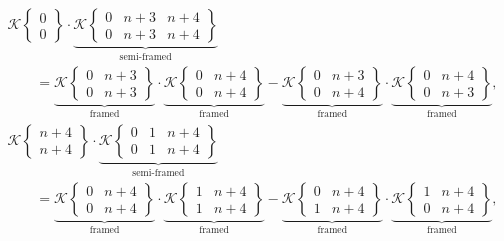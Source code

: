 \documentclass[10pt,a4paper]{amsart}
\numberwithin{equation}{section}
\begin{document}
		\begin{gather}%
\mathscr{K}\left\lbrace \begin{matrix} 0 \\ 0 \end{matrix} \right\rbrace
			\cdot \underbrace{ \mathscr{K}\left\lbrace \begin{matrix} 0 & n+3 & n+4 \\ 0 & n+3 & n+4 \end{matrix} \right\rbrace }_{\text{semi-framed}}\nonumber\\
\qquad = \underbrace{\mathscr{K}\left\lbrace \begin{matrix} 0 & n+3 \\ 0 & n+3 \end{matrix} \right\rbrace}_{\text{framed}} \cdot \underbrace{\mathscr{K}\left\lbrace \begin{matrix} 0 & n+4 \\ 0 & n+4 \end{matrix} \right\rbrace}_{\text{framed}} - \underbrace{\mathscr{K}\left\lbrace \begin{matrix} 0 & n+3 \\ 0 & n+4 \end{matrix} \right\rbrace}_{\text{framed}} \cdot \underbrace{\mathscr{K}\left\lbrace \begin{matrix} 0 & n+4 \\ 0 & n+3 \end{matrix} \right\rbrace}_{\text{framed}},\label{DODGSON framed CC}
\\
\mathscr{K}\left\lbrace \begin{matrix} n+4 \\ n+4 \end{matrix} \right\rbrace
			\cdot \underbrace{ \mathscr{K}\left\lbrace \begin{matrix} 0 & 1 & n+4 \\ 0 & 1 & n+4 \end{matrix} \right\rbrace }_{\text{semi-framed}} \nonumber\\
\qquad= \underbrace{\mathscr{K}\left\lbrace \begin{matrix} 0 & n+4 \\ 0 & n+4 \end{matrix} \right\rbrace}_{\text{framed}} \cdot \underbrace{\mathscr{K}\left\lbrace \begin{matrix} 1 & n+4 \\ 1 & n+4 \end{matrix} \right\rbrace}_{\text{framed}} - \underbrace{\mathscr{K}\left\lbrace \begin{matrix} 0 & n+4 \\ 1 & n+4 \end{matrix} \right\rbrace}_{\text{framed}} \cdot \underbrace{\mathscr{K}\left\lbrace \begin{matrix} 1 & n+4 \\ 0 & n+4 \end{matrix} \right\rbrace}_{\text{framed}},\nonumber

\end{gather}
\end{document}

